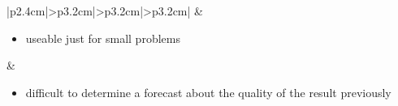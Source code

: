 \begin{table}[H]
\begin{tabular}{|p{2.4cm}|>{\RaggedRight}p{3.2cm}|>{\RaggedRight}p{3.2cm}|>{\RaggedRight}p{3.2cm}|}
		& \begin{minipage}[t]{\linewidth}
			\begin{itemize}[nolistsep, noitemsep,after=\strut,leftmargin=10pt,
				before*={\mbox{}\vspace{-\baselineskip}}]
				\item useable just for small problems
			\end{itemize}
		\end{minipage} 
		
		& \begin{minipage}[t]{\linewidth}
			\begin{itemize}[nolistsep, noitemsep,after=\strut,leftmargin=10pt,
				before*={\mbox{}\vspace{-\baselineskip}}]
				\item difficult to determine a forecast about the quality of the result previously
			\end{itemize}
		\end{minipage} 
 \tabularnewline
				\hline
	\end{tabular}
\end{table}
 
